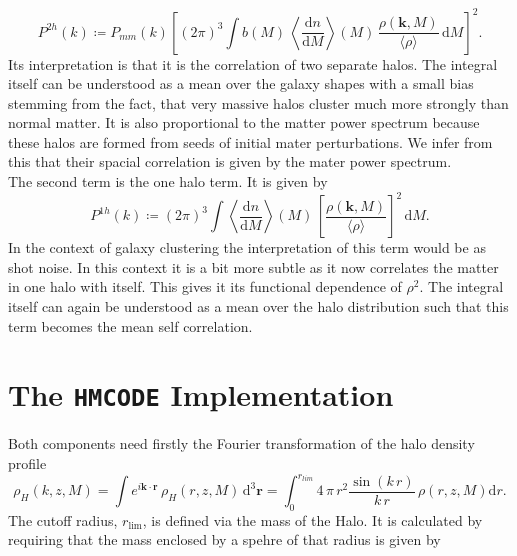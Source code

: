 \documentclass[oneside]{book}
\newcommand*{\rd}{\mathrm{d}}
\newcommand*{\hmcode}{\texttt{HMCODE}\xspace}
\begin{document}
\begin{equation}
P^{2h}(k) \coloneqq P_{mm}(k) \left[(2\pi)^3\int b(M)\,\left\langle\frac{\rd n}{\rd M}\right\rangle\!\!(M)\,\frac{\rho(\boldsymbol{k},M)}{\langle \rho \rangle} \, \rd M\right]^2.
\end{equation}
Its interpretation is that it is the correlation of two separate halos. The integral itself can be understood as a mean over the galaxy shapes with a small bias stemming from the fact, that very massive halos cluster much more strongly than normal matter. It is also proportional to the matter power spectrum because these halos are formed from seeds of initial mater perturbations. We infer from this that their spacial correlation is given by the mater power spectrum.\\
The second term is the one halo term. It is given by 
\begin{equation}
    P^{1h}(k) \coloneqq (2\pi)^3 \int \left\langle\frac{\rd n}{\rd M}\right\rangle\!\!(M)\,\left[\frac{\rho(\boldsymbol{k},M)}{\langle \rho \rangle}\right]^2 \,\rd M.
\end{equation}
In the context of galaxy clustering the interpretation of this term would be as shot noise. In this context it is a bit more subtle as it now correlates the matter in one halo with itself. This gives it its functional dependence of $\rho^2$. The integral itself can again be understood as a mean over the halo distribution such that this term becomes the mean self correlation. 

\section{The \hmcode Implementation}
Both components need firstly the Fourier transformation of the halo density profile
\begin{equation}
    \rho_H(k,z,M) = \int e^{i\boldsymbol{k}\cdot \boldsymbol{r}}\,\rho_H(r,z,M)\,\rd^3 \boldsymbol{r} = \int_0^{r_{lim}} 4\,\pi\,r^2 \frac{\sin(k\,r)}{k\,r}\,\rho(r,z,M) \rd r.
\end{equation}
The cutoff radius, $r_\mathrm{lim}$, is defined via the mass of the Halo. It is calculated by requiring that the mass enclosed by a spehre of that radius is given by 
\end{document}
